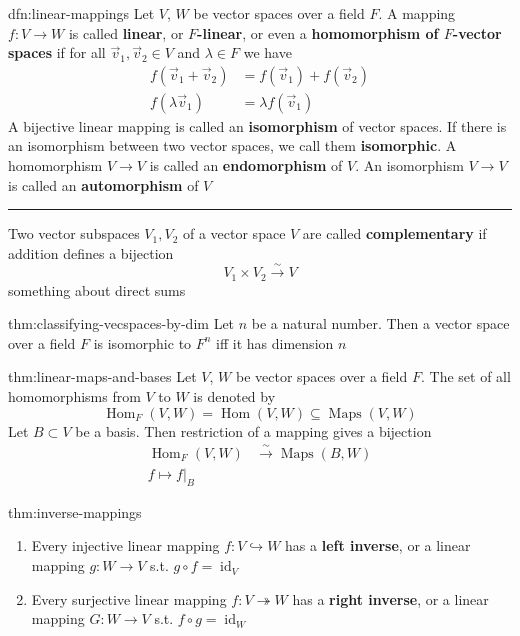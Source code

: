 \documentclass[landscape, 8pt]{extarticle}
\DeclareMathOperator{\Maps}{Maps}
\DeclareMathOperator{\Hom}{Hom}
\DeclareMathOperator{\id}{id}
\begin{document}
\begin{multicols}{3}
\begin{dfn}{dfn:linear-mappings}{}
    Let $V$, $W$ be vector spaces over a field $F$. A mapping $f : V \to W$ is called \textbf{linear}, or \textbf{$F$-linear}, or even a \textbf{homomorphism of $F$-vector spaces} if for all $\vec{v}_{1},\vec{v}_{2}\in V$ and $\lambda \in F$ we have
    \begin{align*}
        f(\vec{v}_{1} + \vec{v}_{2}) &= f(\vec{v}_{1}) + f(\vec{v}_{2})\\
        f(\lambda \vec{v}_{1}) &= \lambda f(\vec{v}_{1})
    \end{align*}
    A bijective linear mapping is called an \textbf{isomorphism} of vector spaces. If there is an isomorphism between two vector spaces, we call them \textbf{isomorphic}. A homomorphism $V\to V$ is called an \textbf{endomorphism} of $V$. An isomorphism $V\to V$ is called an \textbf{automorphism} of $V$

    \noindent\rule{\textwidth}{0.2pt}
    Two vector subspaces $V_{1}, V_{2}$ of a vector space $V$ are called \textbf{complementary} if addition defines a bijection
    \[V_{1} \times V_{2} \xrightarrow{\sim} V\]
    something about direct sums
\end{dfn}

\vspace{-5pt}
\begin{thm}{thm:classifying-vecspaces-by-dim}{}
    Let $n$ be a natural number. Then a vector space over a field $F$ is isomorphic to $F^{n}$ iff it has dimension $n$
\end{thm}

\vspace{-5pt}
\begin{thm}{thm:linear-maps-and-bases}{}
    Let $V$, $W$ be vector spaces over a field $F$. The set of all homomorphisms from $V$ to $W$ is denoted by
    \[\Hom_{F}(V,W) = \Hom(V,W)\subseteq \Maps(V,W)\]
    Let $B \subset V$ be a basis. Then restriction of a mapping gives a bijection
    \begin{align*}
        \Hom_{F}(V, W) &\xrightarrow{\sim} \Maps(B, W) \\
        f \mapsto f \lvert_{B}
    \end{align*}
\end{thm}

\vspace{-5pt}
\begin{thm}{thm:inverse-mappings}{}
    \begin{enumerate}
        \setlength\itemsep{0em}
        \item Every injective linear mapping $f : V \hookrightarrow W$ has a \textbf{left inverse}, or a linear mapping $g : W \to V$ s.t. $g \circ f = \id_{V}$
        \item Every surjective linear mapping $f : V \twoheadrightarrow W$ has a \textbf{right inverse}, or a linear mapping $G : W \to V$ s.t. $f \circ g = \id_{W}$
    \end{enumerate}
\end{thm}


\end{multicols}
\end{document}
